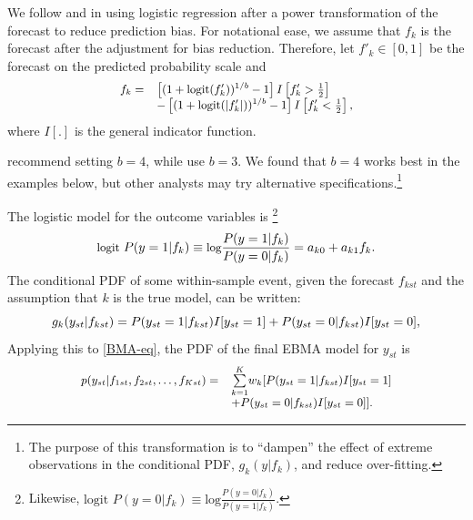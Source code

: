\documentclass[pdftex,12pt,fullpage,oneside]{amsart}
\begin{document}
We follow \citet{Sloughter:2007} and \citet{Hamill:2004} in using
logistic regression after a power transformation of the forecast to
reduce prediction bias. For notational ease, we assume that $f_k$ is the
forecast after the adjustment for bias reduction.  Therefore, let
$f'_k \in [0,1]$ be the forecast on the predicted probability scale
 and
\begin{equation}
\small
\begin{array}{rl}
f_k = & \left[(1+\mbox{logit}(f'_k))^{1/b} - 1\right]I\left[f'_k>\frac{1}{2}\right] \\
& - \left[(1+\mbox{logit}(|f'_k|))^{1/b} -  1\right]I\left[f'_k<\frac{1}{2}\right],\\
\end{array}
 \end{equation}
\noindent where $I[.]$ is the general indicator function.

\citet{Hamill:2004} recommend setting $b=4$, while
\citet{Sloughter:2007} use $b=3$.  We found that $b=4$ works best in
the examples below, but other analysts may try alternative
specifications.\footnote{The purpose of this transformation is to ``dampen''
the effect of extreme observations in the conditional PDF, $g_k(y|f_k)$,
and reduce over-fitting.}

The logistic model for the outcome variables is \footnote{Likewise, $\mbox{logit } P(y=0|f_k) \equiv
 \mbox{log}\frac{P(y=0|f_k)}{P(y=1|f_k)}$.}
\begin{equation} \small
\label{one}
\mbox{logit } P(y=1|f_k) \equiv \mbox{log}\frac{P(y=1|f_k)}{P(y=0|f_k)} = a_{k0}+a_{k1}f_k .
\end{equation}
\noindent The conditional PDF of some within-sample event, given the
forecast $f_{kst}$ and the assumption that $k$ is the true model, can
be written:
\begin{equation} 
\label{component-eq}
\small
g_k(y_{st}|f_{kst}) = P(y_{st}=1|f_{kst})I[y_{st}=1]  + P(y_{st}=0|f_{kst})I[y_{st}=0],
\end{equation}
Applying this to \eqref{BMA-eq}, the PDF of the final EBMA model for
$y_{st}$ is
\begin{equation}
\label{pdf}
\small
\begin{array}{rl}
p(y_{st}|f_{1st}, f_{2st}, \ldots, f_{Kst}) = &
\overset{K}{\underset{k=1}{\sum}} w_k [
P(y_{st}=1|f_{kst})I[y_{st}=1] \\
& + P(y_{st}=0|f_{kst})I[y_{st}=0]].\end{array}
\end{equation}
\end{document}
